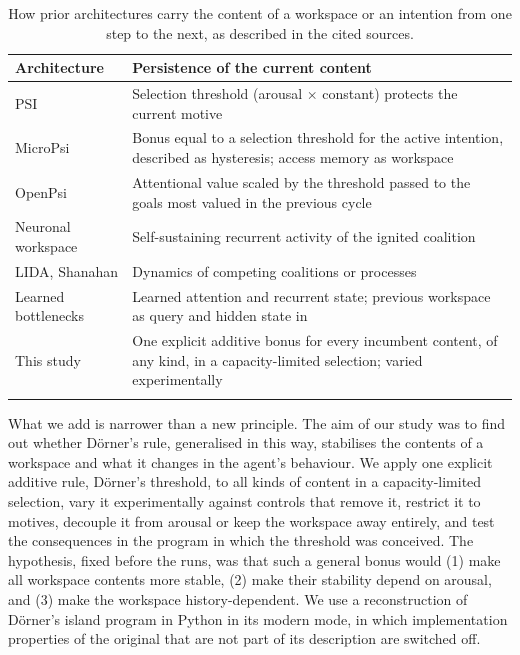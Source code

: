 \documentclass[11pt,a4paper]{article}
\begin{document}
\begin{table}[t]
\centering
\caption{How prior architectures carry the content of a workspace or an intention from one step to the next, as described in the cited sources.}
\label{tab:prior}
\small
\begin{tabularx}{\textwidth}{L{0.26\textwidth} Y}
\toprule
Architecture & Persistence of the current content \\
\midrule
PSI \citep{doerner2002mechanik} & Selection threshold (arousal $\times$ constant) protects the current motive \\ \addlinespace
MicroPsi \citep{bach2009principles} & Bonus equal to a selection threshold for the active intention, described as hysteresis; access memory as workspace \\ \addlinespace
OpenPsi \citep{cai2011openpsi} & Attentional value scaled by the threshold passed to the goals most valued in the previous cycle \\ \addlinespace
Neuronal workspace \citep{dehaene1998neuronal} & Self-sustaining recurrent activity of the ignited coalition \\ \addlinespace
LIDA, Shanahan \citep{franklin2014lida,shanahan2006cognitive} & Dynamics of competing coalitions or processes \\ \addlinespace
Learned bottlenecks \citep{goyal2022coordination,dossa2024design} & Learned attention and recurrent state; previous workspace as query and hidden state in \citet{dossa2024design} \\ \addlinespace
This study & One explicit additive bonus for every incumbent content, of any kind, in a capacity-limited selection; varied experimentally \\ \addlinespace
\bottomrule
\end{tabularx}
\end{table}

What we add is narrower than a new principle. The aim of our study was to find out whether D\"orner's rule, generalised in this way, stabilises the contents of a workspace and what it changes in the agent's behaviour. We apply one explicit additive rule, D\"orner's threshold, to all kinds of content in a capacity-limited selection, vary it experimentally against controls that remove it, restrict it to motives, decouple it from arousal or keep the workspace away entirely, and test the consequences in the program in which the threshold was conceived. The hypothesis, fixed before the runs, was that such a general bonus would (1) make all workspace contents more stable, (2) make their stability depend on arousal, and (3) make the workspace history-dependent. We use a reconstruction of D\"orner's island program in Python \citep{paper1} in its modern mode, in which implementation properties of the original that are not part of its description are switched off.
\end{document}
